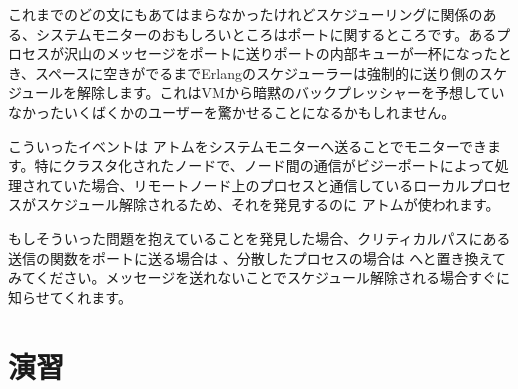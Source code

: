 これまでのどの文にもあてはまらなかったけれどスケジューリングに関係のある、システムモニターのおもしろいところはポートに関するところです。あるプロセスが沢山のメッセージをポートに送りポートの内部キューが一杯になったとき、スペースに空きがでるまでErlangのスケジューラーは強制的に送り側のスケジュールを解除します。これはVMから暗黙のバックプレッシャーを予想していなかったいくばくかのユーザーを驚かせることになるかもしれません。

こういったイベントは  アトムをシステムモニターへ送ることでモニターできます。特にクラスタ化されたノードで、ノード間の通信がビジーポートによって処理されていた場合、リモートノード上のプロセスと通信しているローカルプロセスがスケジュール解除されるため、それを発見するのに  アトムが使われます。

もしそういった問題を抱えていることを発見した場合、クリティカルパスにある送信の関数をポートに送る場合は 、分散したプロセスの場合は  へと置き換えてみてください。メッセージを送れないことでスケジュール解除される場合すぐに知らせてくれます。

\section{演習}

